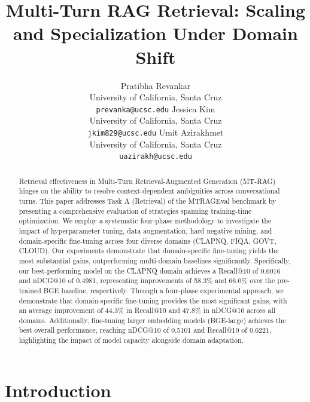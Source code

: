 \documentclass[11pt]{article}
\begin{document}
\title{Multi-Turn RAG Retrieval: Scaling and Specialization Under Domain Shift}

\author{
Pratibha Revankar \\
University of California, Santa Cruz \\
\texttt{prevanka@ucsc.edu}
\And
Jessica Kim \\
University of California, Santa Cruz \\
\texttt{jkim829@ucsc.edu}
\And
Umit Azirakhmet \\
University of California, Santa Cruz \\
\texttt{uazirakh@ucsc.edu}
}

\maketitle

\begin{abstract}
Retrieval effectiveness in Multi-Turn Retrieval-Augmented Generation (MT-RAG) hinges on the ability to resolve context-dependent ambiguities across conversational turns. This paper addresses Task A (Retrieval) of the MTRAGEval benchmark by presenting a comprehensive evaluation of strategies spanning training-time optimization. We employ a systematic four-phase methodology to investigate the impact of hyperparameter tuning, data augmentation, hard negative mining, and domain-specific fine-tuning across four diverse domains (CLAPNQ, FIQA, GOVT, CLOUD). Our experiments demonstrate that domain-specific fine-tuning yields the most substantial gains, outperforming multi-domain baselines significantly. Specifically, our best-performing model on the CLAPNQ domain achieves a Recall@10 of 0.6016 and nDCG@10 of 0.4981, representing improvements of 58.3\% and 66.0\% over the pre-trained BGE baseline, respectively. Through a four-phase experimental approach, we demonstrate that domain-specific fine-tuning provides the most significant gains, with an average improvement of 44.3\% in Recall@10 and 47.8\% in nDCG@10 across all domains. Additionally, fine-tuning larger embedding models (BGE-large) achieves the best overall performance, reaching nDCG@10 of 0.5101 and Recall@10 of 0.6221, highlighting the impact of model capacity alongside domain adaptation.
\end{abstract}

\section{Introduction}
\end{document}
